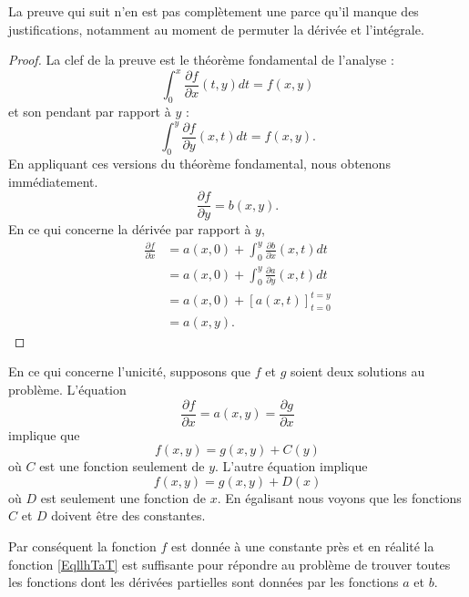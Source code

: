 La preuve qui suit n'en est pas complètement une parce qu'il manque des justifications, notamment au moment de permuter la dérivée et l'intégrale.
\begin{proof}
	La clef de la preuve est le théorème fondamental de l'analyse :
	\begin{equation}
		\int_0^x \frac{ \partial f }{ \partial x }(t,y)dt=f(x,y)
	\end{equation}
	et son pendant par rapport à \( y\) :
	\begin{equation}
		\int_0^y \frac{ \partial f }{ \partial y }(x,t)dt=f(x,y).
	\end{equation}
	En appliquant ces versions du théorème fondamental, nous obtenons immédiatement.
	\begin{equation}
		\frac{ \partial f }{ \partial y }=b(x,y).
	\end{equation}
	En ce qui concerne la dérivée par rapport à \( y\),
	\begin{subequations}
		\begin{align}
			\frac{ \partial f }{ \partial x } & =a(x,0)+\int_0^y\frac{ \partial b }{ \partial x }(x,t)dt \\
			                                  & =a(x,0)+\int_0^y\frac{ \partial a }{ \partial y }(x,t)dt \\
			                                  & =a(x,0)+[a(x,t)]_{t=0}^{t=y}                             \\
			                                  & =a(x,y).
		\end{align}
	\end{subequations}
\end{proof}

En ce qui concerne l'unicité, supposons que \( f\) et \( g\) soient deux solutions au problème. L'équation
\begin{equation}
	\frac{ \partial f }{ \partial x }=a(x,y)=\frac{ \partial g }{ \partial x }
\end{equation}
implique que
\begin{equation}
	f(x,y)=g(x,y)+C(y)
\end{equation}
où \( C\) est une fonction seulement de \( y\). L'autre équation implique
\begin{equation}
	f(x,y)=g(x,y)+D(x)
\end{equation}
où \( D\) est seulement une fonction de \( x\). En égalisant nous voyons que les fonctions \( C\) et \( D\) doivent être des constantes.

Par conséquent la fonction \( f\) est donnée à une constante près et en réalité la fonction \eqref{EqllhTaT} est suffisante pour répondre au problème de trouver toutes les fonctions dont les dérivées partielles sont données par les fonctions \( a\) et \( b\).

